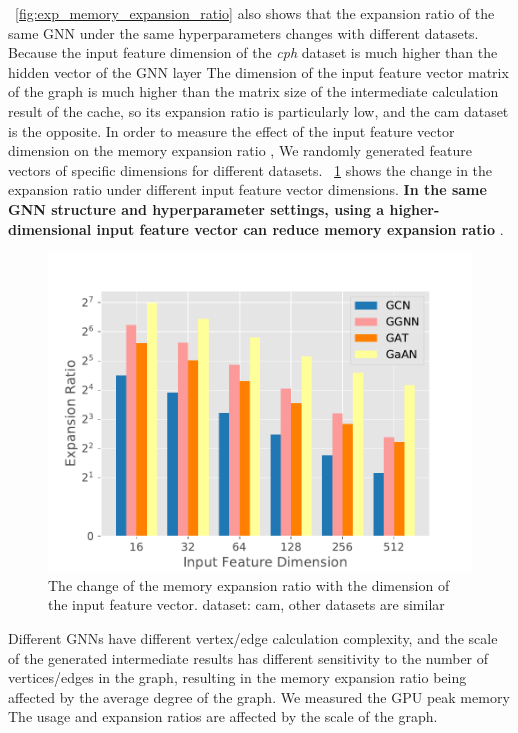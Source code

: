 \figurename~\ref{fig:exp_memory_expansion_ratio} also shows that the expansion ratio of the same GNN under the same hyperparameters changes with different datasets.
Because the input feature dimension of the \textit{cph} dataset is much higher than the hidden vector of the GNN layer The dimension of the input feature vector matrix
of the graph is much higher than the matrix size of the intermediate calculation result of the cache,
so its expansion ratio is particularly low, and the cam dataset is the opposite. In order to measure the effect of the input feature vector dimension on the memory
expansion ratio , We randomly generated feature vectors of specific dimensions for different datasets.
\figurename~\ref{fig:exp_memory_expension_ratio_input_feature_dimension} shows the change in the expansion ratio under different input feature vector dimensions.
\textbf{In the same GNN structure and hyperparameter settings, using a higher-dimensional input feature vector can reduce memory expansion ratio} .

\begin{figure}
    \centering
    \includegraphics[width=0.7\columnwidth]{figs/experiments/exp_memory_expansion_ratio_input_feature_dimension_com-amazon.pdf}
    \caption{The change of the memory expansion ratio with the dimension of the input feature vector. dataset: cam, other datasets are similar}
    \label{fig:exp_memory_expension_ratio_input_feature_dimension}
\end{figure}

Different GNNs have different vertex/edge calculation complexity, and the scale of the generated intermediate results has different sensitivity
to the number of vertices/edges in the graph, resulting in the memory expansion ratio being affected by the average degree of the graph.
We measured the GPU peak memory The usage and expansion ratios are affected by the scale of the graph.

